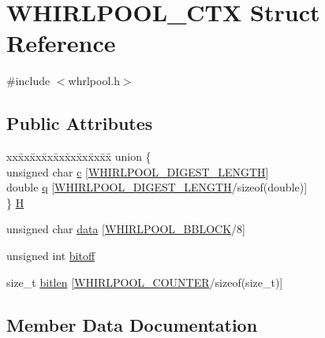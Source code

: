 \hypertarget{struct_w_h_i_r_l_p_o_o_l___c_t_x}{}\section{W\+H\+I\+R\+L\+P\+O\+O\+L\+\_\+\+C\+TX Struct Reference}
\label{struct_w_h_i_r_l_p_o_o_l___c_t_x}


{\ttfamily \#include $<$whrlpool.\+h$>$}

\subsection*{Public Attributes}
\begin{DoxyCompactItemize}
\item 
\begin{tabbing}
xx\=xx\=xx\=xx\=xx\=xx\=xx\=xx\=xx\=\kill
union \{\\
\>unsigned char \hyperlink{struct_w_h_i_r_l_p_o_o_l___c_t_x_ae95033cd5a461ce50604676672ad194d}{c} \mbox{[}\hyperlink{whrlpool_8h_addcbb5b0b778aef896b9eccd0c08e18e}{WHIRLPOOL\_DIGEST\_LENGTH}\mbox{]}\\
\>double \hyperlink{struct_w_h_i_r_l_p_o_o_l___c_t_x_acb551fc520e28a3233efa1185dd09272}{q} \mbox{[}\hyperlink{whrlpool_8h_addcbb5b0b778aef896b9eccd0c08e18e}{WHIRLPOOL\_DIGEST\_LENGTH}/sizeof(double)\mbox{]}\\
\} \hyperlink{struct_w_h_i_r_l_p_o_o_l___c_t_x_a236a1b9664b11ebc92b1d7bb8d95c95b}{H}\\

\end{tabbing}\item 
unsigned char \hyperlink{struct_w_h_i_r_l_p_o_o_l___c_t_x_ab580a848108e15b30239c9374c53caa7}{data} \mbox{[}\hyperlink{whrlpool_8h_a65ca1c8d3e51542563a11fa1ebaaa095}{W\+H\+I\+R\+L\+P\+O\+O\+L\+\_\+\+B\+B\+L\+O\+CK}/8\mbox{]}
\item 
unsigned int \hyperlink{struct_w_h_i_r_l_p_o_o_l___c_t_x_a9af51a2a30f80139879b0f8a52ef08f0}{bitoff}
\item 
size\+\_\+t \hyperlink{struct_w_h_i_r_l_p_o_o_l___c_t_x_acdb67c455ec2f1ecd07e27e8419b03e0}{bitlen} \mbox{[}\hyperlink{whrlpool_8h_a29662900a78ba844a98b6119ea32975f}{W\+H\+I\+R\+L\+P\+O\+O\+L\+\_\+\+C\+O\+U\+N\+T\+ER}/sizeof(size\+\_\+t)\mbox{]}
\end{DoxyCompactItemize}


\subsection{Member Data Documentation}
